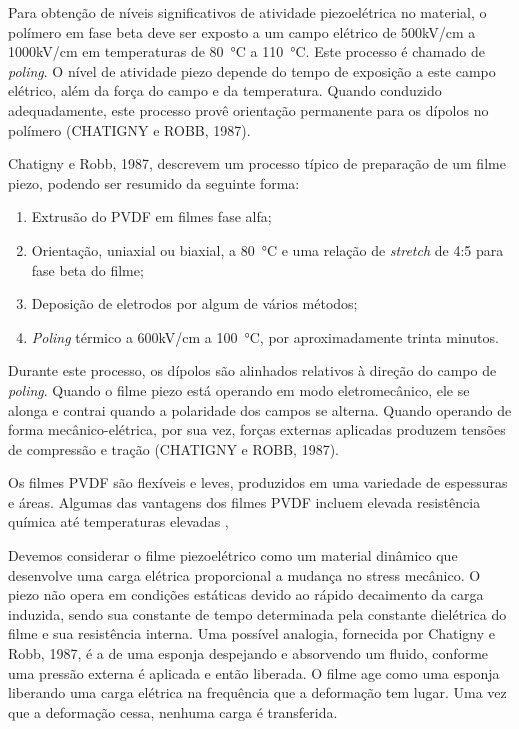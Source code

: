 \documentclass[
	12pt,				
	oneside,			
	a4paper,			
	english,			
	brazil,			
	]{abntex2ppgsi}
\begin{document}
Para obtenção de níveis significativos de atividade piezoelétrica no material, o polímero em fase beta deve ser exposto a um campo elétrico de 500kV/cm a 1000kV/cm em temperaturas de \SI{80}{\celsius} a \SI{110}{\celsius}. Este processo é chamado de \textit{poling}. O nível de atividade piezo depende do tempo de exposição a este campo elétrico, além da força do campo e da temperatura. Quando conduzido adequadamente, este processo provê orientação permanente para os dípolos no polímero (CHATIGNY e ROBB, 1987). 



Chatigny e Robb, 1987, descrevem um processo típico de preparação de um filme piezo, podendo ser resumido da seguinte forma:

\begin{enumerate}
	\item Extrusão do PVDF em filmes fase alfa; 
	\item Orientação, uniaxial ou biaxial, a \SI{80}{\celsius} e uma relação de \textit{stretch} de 4:5 para fase beta do filme;
	\item Deposição de eletrodos por algum de vários métodos;
	\item \textit{Poling} térmico a 600kV/cm a \SI{100}{\celsius}, por aproximadamente trinta minutos.
\end{enumerate}

Durante este processo, os dípolos são alinhados relativos à direção do campo de \textit{poling}. Quando o filme piezo está operando em modo eletromecânico, ele se alonga e contrai quando a polaridade dos campos se alterna. Quando operando de forma mecânico-elétrica, por sua vez, forças externas aplicadas produzem tensões de compressão e tração (CHATIGNY e ROBB, 1987). 

Os filmes PVDF são flexíveis e leves, produzidos em uma variedade de espessuras e áreas. Algumas das vantagens dos filmes PVDF incluem elevada resistência química até temperaturas elevadas , 

Devemos considerar o filme piezoelétrico como um material dinâmico que desenvolve uma carga elétrica proporcional a mudança no stress mecânico. O piezo não opera em condições estáticas devido ao rápido decaimento da carga induzida, sendo sua constante de tempo determinada pela constante dielétrica do filme e sua resistência interna. 	Uma possível analogia, fornecida por Chatigny e Robb, 1987, é a de uma esponja despejando e absorvendo um fluido, conforme uma pressão externa é aplicada e então liberada. O filme age como uma esponja liberando uma carga elétrica na frequência que a deformação tem lugar. Uma vez que a deformação cessa, nenhuma carga é transferida. 
\end{document}
